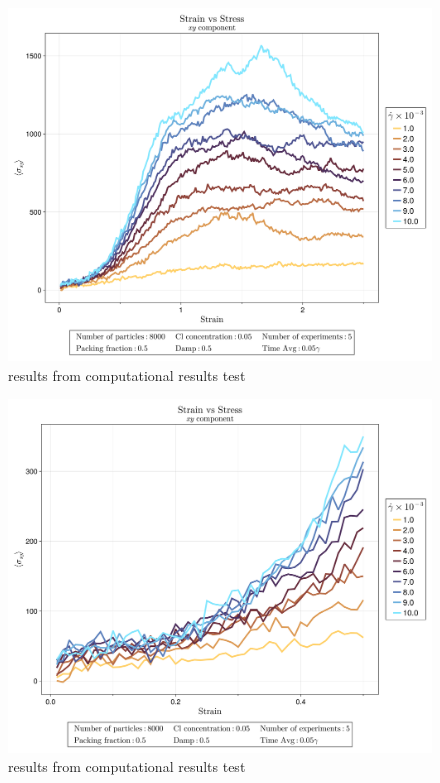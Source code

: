\begin{figure}[ht!]
    \centering
    \includegraphics[width=\textwidth]{figs/ComputaitonalResults/CL5/SmallStrainStressXY.png}
    \caption{results from computational results test}
\end{figure}

\begin{figure}[ht!]
    \centering
    \includegraphics[width=\textwidth]{figs/ComputaitonalResults/CL5/ElasticStrainStressXY.png}
    \caption{results from computational results test}
\end{figure}

